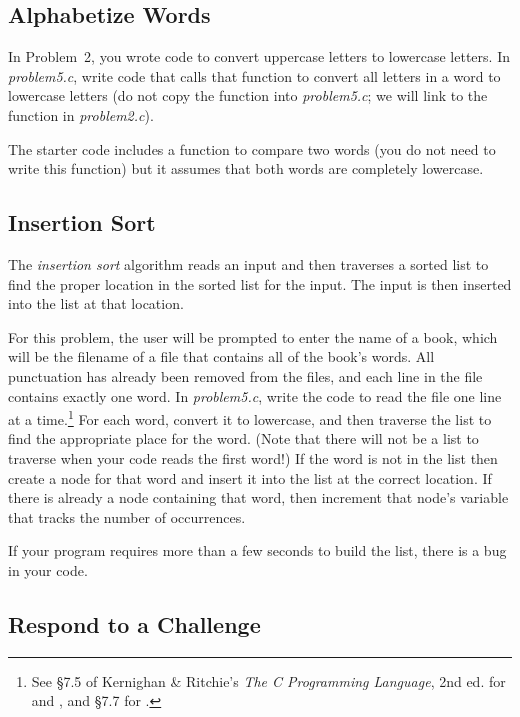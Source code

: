 \subsection{Alphabetize Words}

In Problem~2, you wrote code to convert uppercase letters to lowercase letters.
In \textit{problem5.c}, write code that calls that function to convert all
letters in a word to lowercase letters (do not copy the
 function into \textit{problem5.c}; we will link to
the function in \textit{problem2.c}).

The starter code includes a function to compare two words (you do not need to
write this function) but it assumes that both words are completely lowercase.

\subsection{Insertion Sort}

The \textit{insertion sort} algorithm reads an input and then traverses a
sorted list to find the proper location in the sorted list for the input. The
input is then inserted into the list at that location.

For this problem, the user will be prompted to enter the name of a book, which
will be the filename of a file that contains all of the book's words. All
punctuation has already been removed from the files, and each line in the
file contains exactly one word. In \textit{problem5.c}, write the code to read
the file one line at a time.\footnote{See \S7.5 of Kernighan \& Ritchie's
\textit{The C Programming Language}, 2nd ed. for  and
, and \S7.7 for .} For each word,
convert it to lowercase, and then traverse the list to find the appropriate
place for the word. (Note that there will not be a list to traverse when your
code reads the first word!) If the word is not in the list then create a node
for that word and insert it into the list at the correct location. If there is
already a node containing that word, then increment that node's variable that
tracks the number of occurrences.

If your program requires more than a few seconds to build the list, there is a
bug in your code.

\subsection{Respond to a Challenge}

